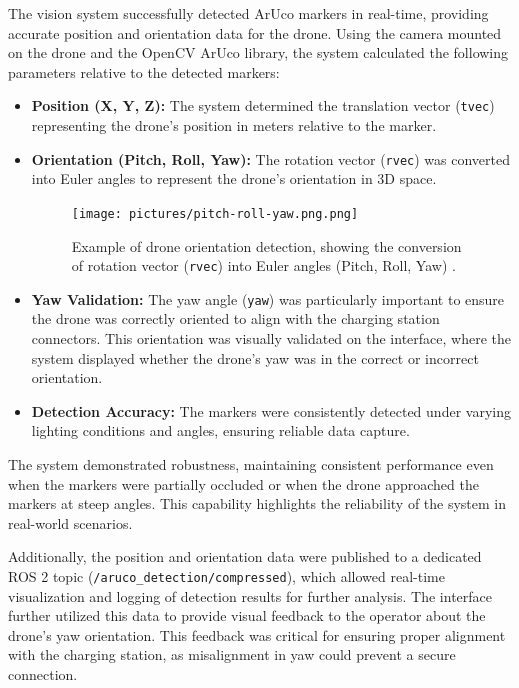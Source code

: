 The vision system successfully detected ArUco markers in real-time, providing accurate position and orientation data for the drone. Using the camera mounted on the drone and the OpenCV ArUco library, the system calculated the following parameters relative to the detected markers:
\begin{itemize}
    \item \textbf{Position (X, Y, Z):} The system determined the translation vector (\texttt{tvec}) representing the drone's position in meters relative to the marker.
    
    \item \textbf{Orientation (Pitch, Roll, Yaw):} The rotation vector (\texttt{rvec}) was converted into Euler angles to represent the drone's orientation in 3D space.
    
    \begin{figure}[H]
        \centering
        \texttt{[image: pictures/pitch-roll-yaw.png.png]}
        \caption{Example of drone orientation detection, showing the conversion of rotation vector (\texttt{rvec}) into Euler angles (Pitch, Roll, Yaw) \cite{researchgate_orientation}.}
        \label{fig:drone_orientation}
    \end{figure}

    \item \textbf{Yaw Validation:} The yaw angle (\texttt{yaw}) was particularly important to ensure the drone was correctly oriented to align with the charging station connectors. This orientation was visually validated on the interface, where the system displayed whether the drone's yaw was in the correct or incorrect orientation.
    \item \textbf{Detection Accuracy:} The markers were consistently detected under varying lighting conditions and angles, ensuring reliable data capture.
\end{itemize}

The system demonstrated robustness, maintaining consistent performance even when the markers were partially occluded or when the drone approached the markers at steep angles. This capability highlights the reliability of the system in real-world scenarios.

Additionally, the position and orientation data were published to a dedicated ROS 2 topic (\texttt{/aruco\_detection/compressed}), which allowed real-time visualization and logging of detection results for further analysis. The interface further utilized this data to provide visual feedback to the operator about the drone's yaw orientation. This feedback was critical for ensuring proper alignment with the charging station, as misalignment in yaw could prevent a secure connection.

